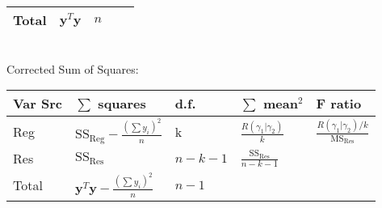 \documentclass[10pt,landscape]{article}
\begin{document}
\begin{multicols}{3}
\begin{tabular}{|l|l|l|l|l|}
         Total&  $\mathbf y^T\mathbf y$&  $n$&  &\\\hline
    \end{tabular}
\medskip\\
Corrected Sum of Squares:
\begin{tabular}{|l|l|l|l|l|}\hline
         Var Src&  $\sum$ squares & d.f.& $\sum$ mean$^2$ & F ratio\\\hline
         Reg& $\mathrm{SS}_\mathrm{Reg}-\frac{(\sum{y_i})^2}{n}$& k& $\frac{R(\gamma_1|\gamma_2)}{k}$& $\frac{R(\gamma_1|\gamma_2)/k}{\mathrm{MS}_\mathrm{Res}}$\\\hline
         Res&$\mathrm{SS}_\mathrm{Res}$&$n-k-1$&$\frac{\mathrm{SS}_\mathrm{Res}}{n-k-1}$& \\\hline
         Total&  $\mathbf y^T\mathbf y-\frac{(\sum{y_i})^2}{n}$&  $n-1$&  &\\\hline
    \end{tabular}
\medskip

\end{multicols}
\end{document}
